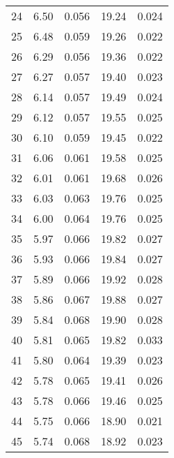 \begin{table}
\begin{tabular}{c|ll|ll}
24 & 6.50 & 0.056 & 19.24 & 0.024 \\
25 & 6.48 & 0.059 & 19.26 & 0.022 \\
26 & 6.29 & 0.056 & 19.36 & 0.022 \\
27 & 6.27 & 0.057 & 19.40 & 0.023 \\
28 & 6.14 & 0.057 & 19.49 & 0.024 \\
29 & 6.12 & 0.057 & 19.55 & 0.025 \\
30 & 6.10 & 0.059 & 19.45 & 0.022 \\
31 & 6.06 & 0.061 & 19.58 & 0.025 \\
32 & 6.01 & 0.061 & 19.68 & 0.026 \\
33 & 6.03 & 0.063 & 19.76 & 0.025 \\
34 & 6.00 & 0.064 & 19.76 & 0.025 \\
35 & 5.97 & 0.066 & 19.82 & 0.027 \\
36 & 5.93 & 0.066 & 19.84 & 0.027 \\
37 & 5.89 & 0.066 & 19.92 & 0.028 \\
38 & 5.86 & 0.067 & 19.88 & 0.027 \\
39 & 5.84 & 0.068 & 19.90 & 0.028 \\
40 & 5.81 & 0.065 & 19.82 & 0.033 \\
41 & 5.80 & 0.064 & 19.39 & 0.023 \\
42 & 5.78 & 0.065 & 19.41 & 0.026 \\
43 & 5.78 & 0.066 & 19.46 & 0.025 \\
44 & 5.75 & 0.066 & 18.90 & 0.021 \\
45 & 5.74 & 0.068 & 18.92 & 0.023 \\
               \hline
        \end{tabular}
    \end{table}
    \clearpage

